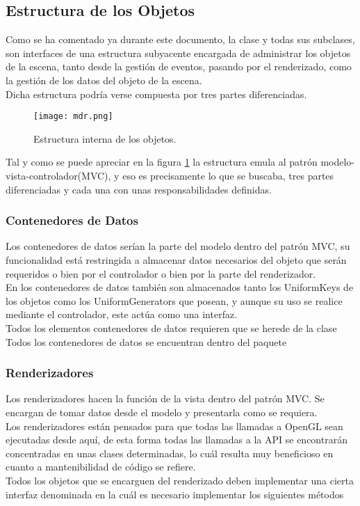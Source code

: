 \subsection{Estructura de los Objetos}
Como se ha comentado ya durante este documento, la clase \rorefobject y todas sus subclases, son interfaces de una estructura subyacente encargada de administrar los objetos de la escena, tanto desde la gestión de eventos, pasando por el renderizado, como la gestión de los datos del objeto de la escena.\\
Dicha estructura podría verse compuesta por tres partes diferenciadas.

\begin{figure}[h!]
\begin{center}
\texttt{[image: mdr.png]}
\end{center}
\caption[Estructura interna de los objetos]{Estructura interna de los objetos.}
\label{fig:mdr}
\end{figure}

Tal y como se puede apreciar en la figura \ref{fig:mdr} la estructura emula al patrón modelo-vista-controlador(MVC), y eso es precisamente lo que se buscaba, tres partes diferenciadas y cada una con unas responsabilidades definidas.

\subsubsection{Contenedores de Datos}
Los contenedores de datos serían la parte del modelo dentro del patrón MVC, su funcionalidad está restringida a almacenar datos necesarios del objeto que serán requeridos o bien por el controlador o bien por la parte del renderizador.\\
En los contenedores de datos también son almacenados tanto los UniformKeys de los objetos como los UniformGenerators que posean, y aunque su uso se realice mediante el controlador, este actúa como una interfaz.\\
Todos los elementos contenedores de datos requieren que se herede de la clase \rorefobjectdata\\
Todos los contenedores de datos se encuentran dentro del paquete 
\subsubsection{Renderizadores}
Los renderizadores hacen la función de la vista dentro del patrón MVC. Se encargan de tomar datos desde el modelo y presentarla como se requiera.\\
Los renderizadores están pensados para que todas las llamadas a OpenGL sean ejecutadas desde aquí, de esta forma todas las llamadas a la API se encontrarán concentradas en unas clases determinadas, lo cuál resulta muy beneficioso en cuanto a mantenibilidad de código se refiere.\\
Todos los objetos que se encarguen del renderizado deben implementar una cierta interfaz denominada \rorefobjectrender en la cuál es necesario implementar los siguientes métodos

